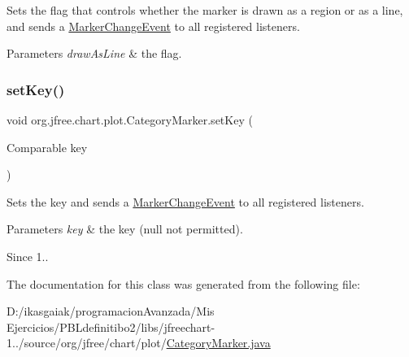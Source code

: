 Sets the flag that controls whether the marker is drawn as a region or as a line, and sends a \mbox{\hyperlink{}{Marker\+Change\+Event}} to all registered listeners.


\begin{DoxyParams}{Parameters}
{\em draw\+As\+Line} & the flag. \\
\hline
\end{DoxyParams}
\mbox{\label{classorg_1_1jfree_1_1chart_1_1plot_1_1_category_marker_a5af2af9a6e6c4e0cc7c3425d8fcd6b66}} 
\subsubsection{\texorpdfstring{set\+Key()}{setKey()}}
{\footnotesize\ttfamily void org.\+jfree.\+chart.\+plot.\+Category\+Marker.\+set\+Key (\begin{DoxyParamCaption}\item[{Comparable}]{key }\end{DoxyParamCaption})}

Sets the key and sends a \mbox{\hyperlink{}{Marker\+Change\+Event}} to all registered listeners.


\begin{DoxyParams}{Parameters}
{\em key} & the key ({\ttfamily null} not permitted).\\
\hline
\end{DoxyParams}
\begin{DoxySince}{Since}
1.. 
\end{DoxySince}


The documentation for this class was generated from the following file\+:\begin{DoxyCompactItemize}
\item 
D\+:/ikasgaiak/programacion\+Avanzada/\+Mis Ejercicios/\+P\+B\+Ldefinitibo2/libs/jfreechart-\/1../source/org/jfree/chart/plot/\mbox{\hyperlink{_category_marker_8java}{Category\+Marker.\+java}}\end{DoxyCompactItemize}
